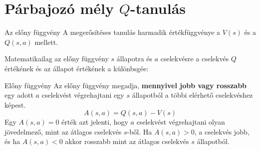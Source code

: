 \documentclass[english, aspectratio=169]{beamer}
\makeatletter
\let\origtableofcontents=\tableofcontents
\def\tableofcontents{\@ifnextchar[{\origtableofcontents}{\gobbletableofcontents}}
\def\gobbletableofcontents#1{\origtableofcontents}
\makeatother
\begin{document}
\section{Párbajozó mély $Q$-tanulás}

\begin{frame}
\tableofcontents[currentsection]
\end{frame}

\begin{frame}{Az előny függvény}
A megerősítéses tanulás harmadik értékfüggvénye a $V(s)$ és a $Q(s,a)$ mellett.\par\smallskip
Matematikailag az előny függvény $s$ állapotra és $a$ cselekvésre a cselekvés $Q$ értékének és az állapot értékének a különbsgée:
\begin{block}{Előny függvény}
Az előny függvény megadja, \textbf{mennyivel jobb vagy rosszabb} egy adott $a$ cselekvést végrehajtani egy $s$ állapotból a többi elérhető cselekvéshez képest.
\[
A(s,a) = Q(s,a) - V(s)
\]
Egy $A(s,a)=0$ érték azt jelenti, hogy $a$ cselekvést végrehajtani olyan jövedelmező, mint az átlagos cselekvés $s$-ből. Ha $A(s,a)>0$, a cselekvés jobb, és ha $A(s,a)<0$ akkor rosszabb mint az átlagos cselekvés $s$ állapotból.
\end{block}
\end{frame}
\end{document}

